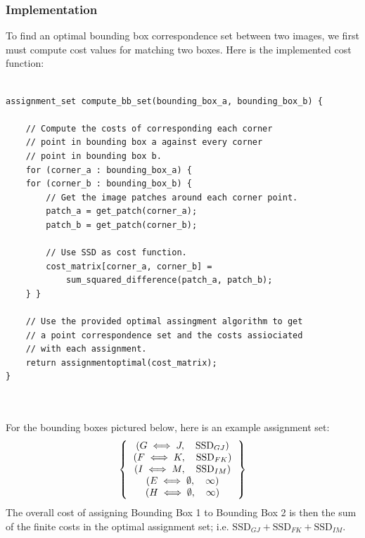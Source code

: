 \documentclass{article}
\begin{document}
\subsubsection{Implementation}
To find an optimal bounding box correspondence set between two images, we first must compute cost values for matching two boxes.  Here is the implemented cost function:
\\
\begin{minipage}{\textwidth}
\begin{lstlisting}

assignment_set compute_bb_set(bounding_box_a, bounding_box_b) {

	// Compute the costs of corresponding each corner
	// point in bounding box a against every corner
	// point in bounding box b.
	for (corner_a : bounding_box_a) {
	for (corner_b : bounding_box_b) {
		// Get the image patches around each corner point.
		patch_a = get_patch(corner_a);
		patch_b = get_patch(corner_b);
			
		// Use SSD as cost function.
		cost_matrix[corner_a, corner_b] =
			sum_squared_difference(patch_a, patch_b);
	} }
	
	// Use the provided optimal assingment algorithm to get
	// a point correspondence set and the costs assiociated
	// with each assignment.
	return assignmentoptimal(cost_matrix);
}

\end{lstlisting}
\end{minipage}
\\~\\
For the bounding boxes pictured below, here is an example assignment set:
\[
\left \{
\begin{tabular}{c}
$(G \iff J,\quad \text{SSD}_{GJ})$ \\
$(F \iff K,\quad \text{SSD}_{FK})$ \\
$(I \iff M,\quad \text{SSD}_{IM})$ \\
$(E \iff \emptyset,\quad \infty)$ \\
$(H \iff \emptyset,\quad \infty)$
\end{tabular}
\right \}
\]
The overall cost of assigning Bounding Box 1 to Bounding Box 2 is then the sum of the finite costs in the optimal assignment set; i.e. $\text{SSD}_{GJ} + \text{SSD}_{FK} + \text{SSD}_{IM}$.
\begin{center}
\end{center}
\end{document}
